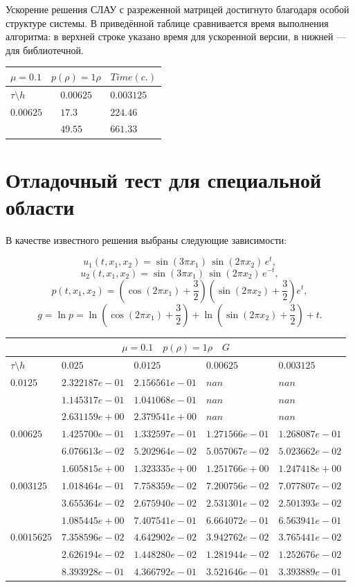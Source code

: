 \documentclass[a4paper,12pt]{extarticle}
\begin{document}
Ускорение решения СЛАУ с разреженной матрицей достигнуто благодаря особой структуре системы. В приведённой таблице сравнивается время выполнения алгоритма: в верхней строке указано время для ускоренной версии, в нижней — для библиотечной.

\begin{tabular}{|l|l|l|}
	\hline
	\multicolumn{3}{|c|}{$\mu =0.1 \quad  p(\rho) =1 \rho \quad Time (c.)$}\\
	\hline
	$\tau\setminus h$ & $0.00625$ & $0.003125$\\
	\hline
	$0.00625$  & $17.3$ & $224.46$ \\
	& $49.55$ & $661.33$ \\
	\hline
\end{tabular}

\section{Отладочный тест для специальной области}

В качестве известного решения выбраны следующие зависимости:

\[
u_1(t,x_1,x_2) = \sin(3\pi x_1)\,\sin(2\pi x_2)\,e^{t},
\]
\[
u_2(t,x_1,x_2) = \sin(3\pi x_1)\,\sin(2\pi x_2)\,e^{-t},
\]
\[
p(t,x_1,x_2) = \left(\cos(2\pi x_1)+\frac{3}{2}\right)\left(\sin(2\pi x_2)+\frac{3}{2}\right)e^{t},
\]
\[
g = \ln p = \ln\!\left(\cos(2\pi x_1)+\frac{3}{2}\right)+\ln\!\left(\sin(2\pi x_2)+\frac{3}{2}\right)+t.
\]

\begin{tabular}{|l|l|l|l|l|}
	\hline
	\multicolumn{5}{|c|}{$\mu =0.1 \quad  p(\rho) =1 \rho \quad G$}\\
	\hline
	$\tau\setminus h$ & $0.025$ & $0.0125$ & $0.00625$ & $0.003125$\\
	\hline
	$0.0125$  & $2.322187e-01$ & $2.156561e-01$ & $nan$ & $nan$\\
	& $1.145317e-01$ & $1.041068e-01$ & $nan$ & $nan$\\
	& $2.631159e+00$ & $2.379541e+00$ & $nan$ & $nan$\\
	\hline
	$0.00625$  & $1.425700e-01$ & $1.332597e-01$ & $1.271566e-01$ & $1.268087e-01$\\
	& $6.076613e-02$ & $5.202964e-02$ & $5.057067e-02$ & $5.023662e-02$\\
	& $1.605815e+00$ & $1.323335e+00$ & $1.251766e+00$ & $1.247418e+00$\\
	\hline
	$0.003125$  & $1.018464e-01$ & $7.758359e-02$ & $7.200756e-02$ & $7.077807e-02$\\
	& $3.655364e-02$ & $2.675940e-02$ & $2.531301e-02$ & $2.501393e-02$\\
	& $1.085445e+00$ & $7.407541e-01$ & $6.664072e-01$ & $6.563941e-01$\\
	\hline
	$0.0015625$  & $7.358596e-02$ & $4.642902e-02$ & $3.942762e-02$ & $3.765441e-02$\\
	& $2.626194e-02$ & $1.448280e-02$ & $1.281944e-02$ & $1.252676e-02$\\
	& $8.393928e-01$ & $4.366792e-01$ & $3.521646e-01$ & $3.393889e-01$\\
	\hline
\end{tabular}
\end{document}
